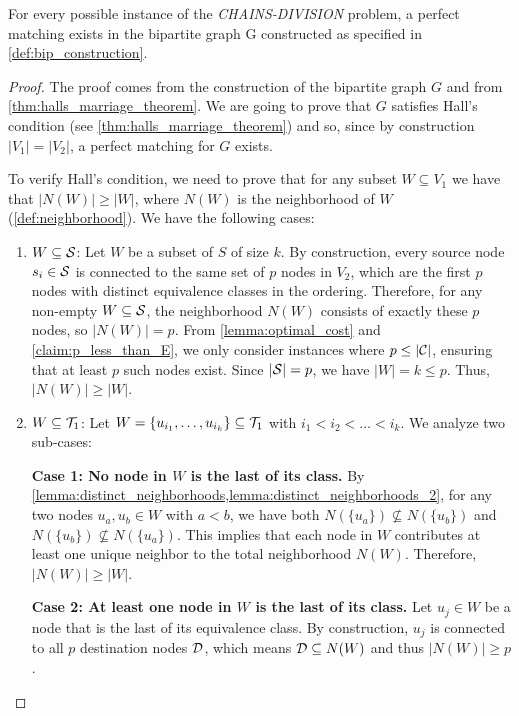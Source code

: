 \begin{lemma} \label{lemma:matching_existence}
    For every possible instance of the \textit{CHAINS-DIVISION} problem, a perfect matching exists in the bipartite graph G constructed as specified in \cref{def:bip_construction}.
\end{lemma}
\begin{proof}
    The proof comes from the construction of the bipartite graph $G$ and from \cref{thm:halls_marriage_theorem}. We are going to prove that $G$ satisfies Hall's condition (see \cref{thm:halls_marriage_theorem}) and so, since by construction $|V_1| = |V_2|$, a perfect matching for $G$ exists.

    To verify Hall's condition, we need to prove that for any subset $W \subseteq V_1$ we have that $|N(W)| \geq |W|$, where $N(W)$ is the neighborhood of $W$ (\cref{def:neighborhood}). We have the following cases:
    \begin{enumerate}[leftmargin=25pt]
        \item $W \subseteq \mathcal{S}$: Let $W$ be a subset of $S$ of size $k$. By construction, every source node $s_i \in \mathcal{S}$ is connected to the same set of $p$ nodes in $V_2$, which are the first $p$ nodes with distinct equivalence classes in the ordering. Therefore, for any non-empty $W \subseteq \mathcal{S}$, the neighborhood $N(W)$ consists of exactly these $p$ nodes, so $|N(W)| = p$. From \cref{lemma:optimal_cost} and \cref{claim:p_less_than_E}, we only consider instances where $p \leq |\mathcal{C}|$, ensuring that at least $p$ such nodes exist. Since $|\mathcal{S}|=p$, we have $|W| = k \leq p$. Thus, $|N(W)| \geq |W|$.
        
        \item $W \subseteq \mathcal{T}_{1}$: Let $W = \{u_{i_1}, \dots, u_{i_k}\} \subseteq \mathcal{T}_{1}$ with $i_1 < i_2 < \dots < i_k$. We analyze two sub-cases:

        \textbf{Case 1: No node in $W$ is the last of its class.}
        By \cref{lemma:distinct_neighborhoods,lemma:distinct_neighborhoods_2}, for any two nodes $u_a, u_b \in W$ with $a < b$, we have both $N(\{u_a\}) \not\subseteq N(\{u_b\})$ and $N(\{u_b\}) \not\subseteq N(\{u_a\})$. This implies that each node in $W$ contributes at least one unique neighbor to the total neighborhood $N(W)$. Therefore, $|N(W)| \geq |W|$.

        \textbf{Case 2: At least one node in $W$ is the last of its class.}
        Let $u_{j} \in W$ be a node that is the last of its equivalence class. By construction, $u_{j}$ is connected to all $p$ destination nodes $\mathcal{D}$, which means $\mathcal{D} \subseteq N(W)$ and thus $|N(W)| \geq p$.


\end{enumerate}
\end{proof}
